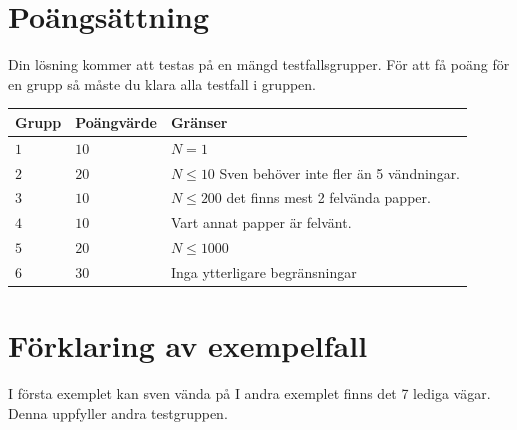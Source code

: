 \section*{Poängsättning}
Din lösning kommer att testas på en mängd testfallsgrupper.
För att få poäng för en grupp så måste du klara alla testfall i gruppen.

\noindent
\begin{tabular}{| l | l | p{12cm} |}
  \hline
  Grupp & Poängvärde & Gränser \\ \hline
  $1$   & $10$       & $N=1$ \\ \hline
  $2$   & $20$       & $N \leq 10$ Sven behöver inte fler än 5 vändningar. \\ \hline
  $3$   & $10$       & $N \leq 200$ det finns mest 2 felvända papper. \\ \hline
  $4$   & $10$       & Vart annat papper är felvänt. \\ \hline
  $5$   & $20$       & $N \leq 1000$ \\ \hline
  $6$   & $30$       & Inga ytterligare begränsningar  \\ \hline
\end{tabular}



\section*{Förklaring av exempelfall}
I första exemplet kan sven vända på 
I andra exemplet finns det 7 lediga vägar. Denna uppfyller andra testgruppen.